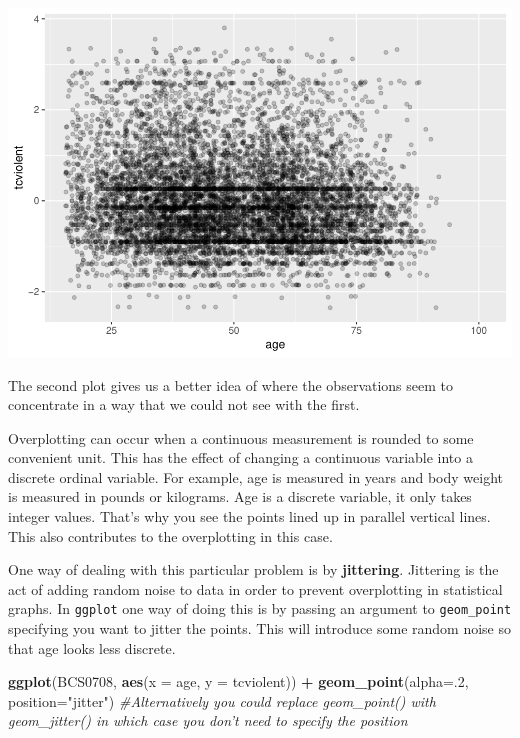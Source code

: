 \documentclass[]{book}
\newenvironment{Shaded}{\begin{snugshade}}{\end{snugshade}}
\newcommand{\CommentTok}[1]{\textcolor[rgb]{0.56,0.35,0.01}{\textit{#1}}}
\newcommand{\DataTypeTok}[1]{\textcolor[rgb]{0.13,0.29,0.53}{#1}}
\newcommand{\DecValTok}[1]{\textcolor[rgb]{0.00,0.00,0.81}{#1}}
\newcommand{\KeywordTok}[1]{\textcolor[rgb]{0.13,0.29,0.53}{\textbf{#1}}}
\newcommand{\NormalTok}[1]{#1}
\newcommand{\OperatorTok}[1]{\textcolor[rgb]{0.81,0.36,0.00}{\textbf{#1}}}
\newcommand{\StringTok}[1]{\textcolor[rgb]{0.31,0.60,0.02}{#1}}
\theoremstyle{definition}
\theoremstyle{definition}
\theoremstyle{definition}
\theoremstyle{remark}
\begin{document}
\includegraphics{03-visualisation_files/figure-latex/unnamed-chunk-38-1.pdf}

The second plot gives us a better idea of where the observations seem to
concentrate in a way that we could not see with the first.

Overplotting can occur when a continuous measurement is rounded to some
convenient unit. This has the effect of changing a continuous variable
into a discrete ordinal variable. For example, age is measured in years
and body weight is measured in pounds or kilograms. Age is a discrete
variable, it only takes integer values. That's why you see the points
lined up in parallel vertical lines. This also contributes to the
overplotting in this case.

One way of dealing with this particular problem is by
\textbf{jittering}. Jittering is the act of adding random noise to data
in order to prevent overplotting in statistical graphs. In
\texttt{ggplot} one way of doing this is by passing an argument to
\texttt{geom\_point} specifying you want to jitter the points. This will
introduce some random noise so that age looks less discrete.

\begin{Shaded}
\begin{Highlighting}[]
\KeywordTok{ggplot}\NormalTok{(BCS0708, }\KeywordTok{aes}\NormalTok{(}\DataTypeTok{x =}\NormalTok{ age, }\DataTypeTok{y =}\NormalTok{ tcviolent)) }\OperatorTok{+}
\StringTok{  }\KeywordTok{geom_point}\NormalTok{(}\DataTypeTok{alpha=}\NormalTok{.}\DecValTok{2}\NormalTok{, }\DataTypeTok{position=}\StringTok{"jitter"}\NormalTok{) }\CommentTok{#Alternatively you could replace geom_point() with geom_jitter() in which case you don't need to specify the position}
\end{Highlighting}
\end{Shaded}
\end{document}
